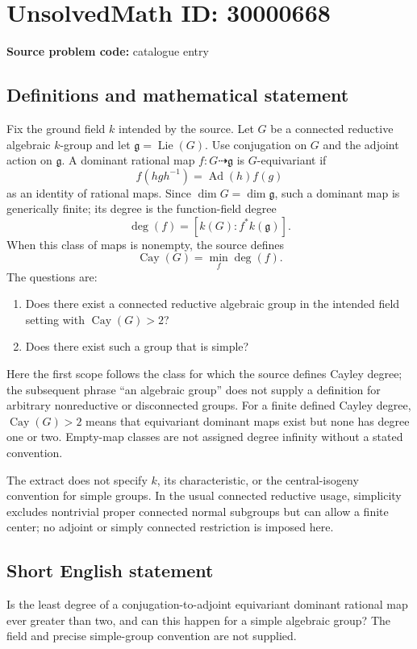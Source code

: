 \documentclass[11pt]{article}
\begin{document}
\section*{UnsolvedMath ID: 30000668}
\textbf{Source problem code:} catalogue entry
\subsection{Definitions and mathematical statement}
Fix the ground field $k$ intended by the source. Let $G$ be a connected reductive algebraic $k$-group and let $\mathfrak g=\operatorname{Lie}(G)$. Use conjugation on $G$ and the adjoint action on $\mathfrak g$. A dominant rational map $f:G\dashrightarrow\mathfrak g$ is $G$-equivariant if
\[
f(hgh^{-1})=\operatorname{Ad}(h)f(g)
\]
as an identity of rational maps. Since $\dim G=\dim\mathfrak g$, such a dominant map is generically finite; its degree is the function-field degree
\[
\deg(f)=[k(G):f^*k(\mathfrak g)].
\]
When this class of maps is nonempty, the source defines
\[
\operatorname{Cay}(G)=\min_f\deg(f).
\]
The questions are:
\begin{enumerate}
\item Does there exist a connected reductive algebraic group in the intended field setting with $\operatorname{Cay}(G)>2$?
\item Does there exist such a group that is simple?
\end{enumerate}
Here the first scope follows the class for which the source defines Cayley degree; the subsequent phrase ``an algebraic group'' does not supply a definition for arbitrary nonreductive or disconnected groups. For a finite defined Cayley degree, $\operatorname{Cay}(G)>2$ means that equivariant dominant maps exist but none has degree one or two. Empty-map classes are not assigned degree infinity without a stated convention.

The extract does not specify $k$, its characteristic, or the central-isogeny convention for simple groups. In the usual connected reductive usage, simplicity excludes nontrivial proper connected normal subgroups but can allow a finite center; no adjoint or simply connected restriction is imposed here.
\subsection{Short English statement}
Is the least degree of a conjugation-to-adjoint equivariant dominant rational map ever greater than two, and can this happen for a simple algebraic group? The field and precise simple-group convention are not supplied.
\end{document}
